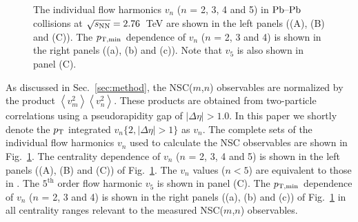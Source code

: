 \begin{figure}
	\begin{center}
        \caption{The individual flow harmonics $v_n$ ($n$ = 2, 3, 4 and 5) in $\textnormal{Pb--Pb}$ collisions at $\sqrt{s_{\textnormal{NN}}}=2.76$~TeV are shown in the left panels ((A), (B) and (C)). The $p_{\rm T, min}$ dependence of $v_n$ ($n$ = 2, 3 and 4) is shown in the right panels ((a), (b) and (c)). Note that $v_5$ is also shown in panel (C).}
        \label{fig:Figure_2A}
        \end{center}   
\end{figure}

As discussed in Sec.~\ref{sec:method}, the NSC($m$,$n$) observables are normalized by the product $\left<v_{m}^2\right>\left<v_{n}^2\right>$.
These products are obtained from two-particle correlations using a pseudorapidity gap of $|\Delta\eta| > 1.0$. 
In this paper we shortly denote the $p_{\rm T}$ integrated $v_{n}\{2, |\Delta\eta|>1\}$ as $v_n$.
The complete sets of the individual flow harmonics $v_n$ used to calculate the NSC observables are shown in Fig.~\ref{fig:Figure_2A}.
The centrality dependence of $v_n$ ($n$ = 2, 3, 4 and 5) is shown in the left panels ((A), (B) and (C)) of  Fig.~\ref{fig:Figure_2A}. The $v_n$ values ($n < 5$) are equivalent to those in \cite{Adam:2016izf}. The $5^{\mathrm{th}}$ order flow harmonic $v_5$ is shown in panel (C). The $p_{\rm T, min}$ dependence of $v_n$ ($n$ = 2, 3 and 4) is shown in the right panels ((a), (b) and (c)) of Fig.~\ref{fig:Figure_2A} in all centrality ranges relevant to the measured NSC($m$,$n$) observables.

